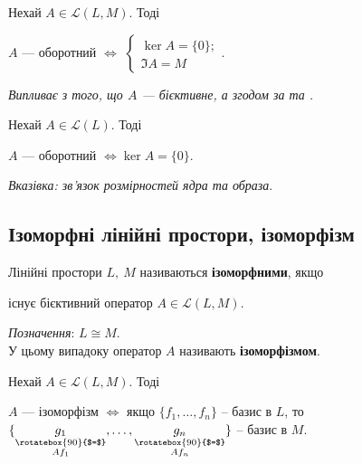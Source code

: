 \documentclass{math_library}
\begin{document}
	\begin{theorem}
	Нехай $A \in \mathcal{L}(L,M)$. Тоді
	\begin{center}
	$A$ --- оборотний $\iff$ $\begin{cases} \ker A = \{0\}; \\ \Im A = M \end{cases}.$
	\end{center}
	\textit{Випливає з того, що $A$ --- бієктивне, а згодом за  та .}
	\end{theorem}
	
	\begin{corollary}
	Нехай $A \in \mathcal{L}(L)$. Тоді
	\begin{center}
	$A$ --- оборотний $\iff \ker A = \{0\}$.
	\end{center}
	\textit{Вказівка: зв'язок розмірностей ядра та образа}.
	\end{corollary}
	
	\subsection{Ізоморфні лінійні простори, ізоморфізм}
	\begin{definition}
	Лінійні простори $L,\ M$ називаються \textbf{ізоморфними}, якщо
	\begin{center}
	існує бієктивний оператор $A \in \mathcal{L}(L,M)$.
	\end{center}
	\textit{Позначення}: $L \cong M$.\\
	У цьому випадоку оператор $A$ називають \textbf{ізоморфізмом}.
	\end{definition}
	
	\begin{theorem}
	Нехай $A \in \mathcal{L}(L,M)$. Тоді
	\begin{center}
	$A$ --- ізоморфізм $\iff$ якщо $\{f_1,\dots,f_n\}$ -- базис в $L$, то $\{\underset{\substack{\rotatebox{90}{$=$} \\ Af_1}}{g_1},\dots, \underset{\substack{\rotatebox{90}{$=$} \\ Af_n}}{g_n}\}$ -- базис в $M$.
	\end{center}
	\end{theorem}
	
\end{document}
